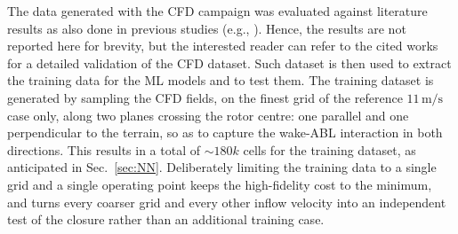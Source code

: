 The data generated with the CFD campaign was evaluated against literature results \cite{alessio5-mw, Troldborg} as also done in previous studies (e.g., \cite{Carloni2026}). Hence, the results are not reported here for brevity, but the interested reader can refer to the cited works for a detailed validation of the CFD dataset.
Such dataset is then used to extract the training data for the ML models and to test them.
The training dataset is generated by sampling the CFD fields, on the finest grid of the reference $11\,\mathrm{m/s}$ case only, along two planes crossing the rotor centre: one parallel and one perpendicular to the terrain, so as to capture the wake-ABL interaction in both directions. This results in a total of $\sim 180k$ cells for the training dataset, as anticipated in Sec.~\ref{sec:NN}. Deliberately limiting the training data to a single grid and a single operating point keeps the high-fidelity cost to the minimum, and turns every coarser grid and every other inflow velocity into an independent test of the closure rather than an additional training case.